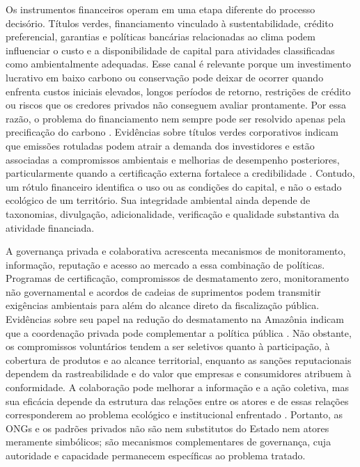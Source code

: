 Os instrumentos financeiros operam em uma etapa diferente do processo decisório. Títulos verdes, financiamento vinculado à sustentabilidade, crédito preferencial, garantias e políticas bancárias relacionadas ao clima podem influenciar o custo e a disponibilidade de capital para atividades classificadas como ambientalmente adequadas. Esse canal é relevante porque um investimento lucrativo em baixo carbono ou conservação pode deixar de ocorrer quando enfrenta custos iniciais elevados, longos períodos de retorno, restrições de crédito ou riscos que os credores privados não conseguem avaliar prontamente. Por essa razão, o problema do financiamento nem sempre pode ser resolvido apenas pela precificação do carbono \cite{campiglio2016banking}. Evidências sobre títulos verdes corporativos indicam que emissões rotuladas podem atrair a demanda dos investidores e estão associadas a compromissos ambientais e melhorias de desempenho posteriores, particularmente quando a certificação externa fortalece a credibilidade \cite{flammer2021green}. Contudo, um rótulo financeiro identifica o uso ou as condições do capital, e não o estado ecológico de um território. Sua integridade ambiental ainda depende de taxonomias, divulgação, adicionalidade, verificação e qualidade substantiva da atividade financiada.

A governança privada e colaborativa acrescenta mecanismos de monitoramento, informação, reputação e acesso ao mercado a essa combinação de políticas. Programas de certificação, compromissos de desmatamento zero, monitoramento não governamental e acordos de cadeias de suprimentos podem transmitir exigências ambientais para além do alcance direto da fiscalização pública. Evidências sobre seu papel na redução do desmatamento na Amazônia indicam que a coordenação privada pode complementar a política pública \cite{nepstad2014slowing}. Não obstante, os compromissos voluntários tendem a ser seletivos quanto à participação, à cobertura de produtos e ao alcance territorial, enquanto as sanções reputacionais dependem da rastreabilidade e do valor que empresas e consumidores atribuem à conformidade. A colaboração pode melhorar a informação e a ação coletiva, mas sua eficácia depende da estrutura das relações entre os atores e de essas relações corresponderem ao problema ecológico e institucional enfrentado \cite{bodin2017collaborative}. Portanto, as ONGs e os padrões privados não são nem substitutos do Estado nem atores meramente simbólicos; são mecanismos complementares de governança, cuja autoridade e capacidade permanecem específicas ao problema tratado.

